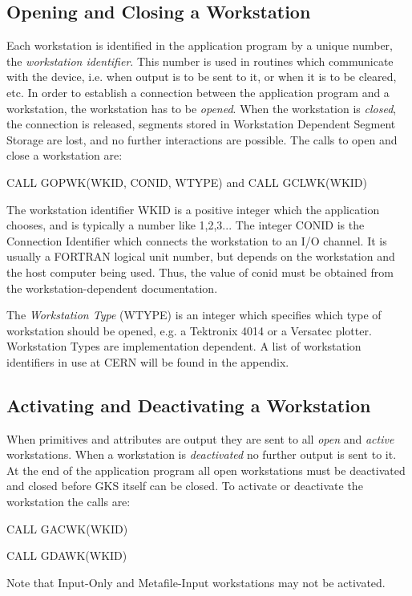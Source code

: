 \subsection{Opening and Closing a Workstation}
 
Each workstation is identified in the application program by a
unique number, the {\it workstation identifier}. This number is used
in routines which communicate with the device, i.e. when output is to be
sent to it, or when it is to be cleared, etc. In order
to establish a connection between the application program and
a workstation, the workstation has to be {\it opened}.
When the workstation is {\it closed},
the connection is released, segments stored in Workstation Dependent
Segment Storage are lost, and no further interactions are possible.
The calls to open and close a workstation are:
\begin{XMP}
CALL GOPWK(WKID, CONID, WTYPE)
   and
CALL GCLWK(WKID)
\end{XMP}
 
The workstation identifier WKID is a positive integer which the
application chooses, and is typically a number like 1,2,3...
The integer CONID is the Connection Identifier which connects the
workstation to an I/O channel. It is usually a FORTRAN logical unit
number, but depends on the workstation and the host computer being used.
Thus, the value of conid must be obtained from the
workstation-dependent documentation.
 
The {\it Workstation Type} (WTYPE) is an integer which specifies
which type of workstation should be opened,
e.g. a Tektronix 4014 or a Versatec plotter.
Workstation Types are implementation dependent.
A list of workstation identifiers in use at CERN will be found in the
appendix.
\subsection{Activating and Deactivating a Workstation}
 
When primitives and attributes are output they are sent to all
{\it open} and {\it active} workstations.
When a workstation is {\it deactivated} no further
output is sent to it. At the end of the application program all open
workstations must be deactivated and closed before GKS itself can be closed.
To activate or deactivate the workstation the calls are:
\begin{XMP}
CALL GACWK(WKID)
 
CALL GDAWK(WKID)
\end{XMP}
Note that Input-Only and Metafile-Input workstations may not be activated.

